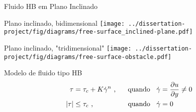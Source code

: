 \begin{frame}{Fluido HB em Plano Inclinado}
    \begin{minipage}[c]{0.49\textwidth}
        \begin{exampleblock}{Plano inclinado, bidimensional}
            \texttt{[image: ../dissertation-project/fig/diagrams/free-surface\_inclined-plane.pdf]}
        \end{exampleblock}
    \end{minipage}
    \hfill
    \begin{minipage}[c]{0.49\textwidth}
        \begin{exampleblock}{Plano inclinado, "tridimensional"}
            \texttt{[image: ../dissertation-project/fig/diagrams/free-surface-obstacle.pdf]}
        \end{exampleblock}
    \end{minipage}
\end{frame}

\begin{frame}
    \begin{exampleblock}{Modelo de fluido tipo HB}
        \begin{equation}
            \label{eq:HB_shear_stress}
            \begin{split}
                \tau &= \tau_c + K \dot{\gamma}^n
                \text{ ,\hspace{0.5 cm} quando \hspace{0.2cm}} \dot{\gamma} = \frac{\partial u}{\partial y} \ne 0
                \\
                |\tau| &\leq \tau_c
                \text{ ,\hspace{1.65cm} quando \hspace{0.2cm}} \dot{\gamma} = 0
            \end{split}
        \end{equation}
    \end{exampleblock}
\end{frame}

